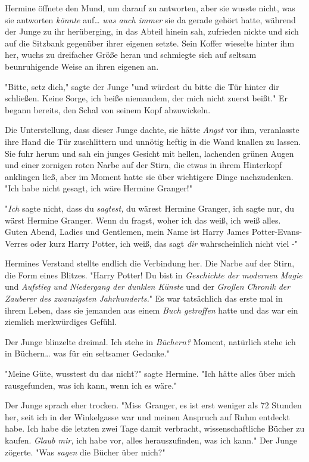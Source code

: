 {Hermine öffnete den Mund, um darauf zu antworten, aber sie wusste nicht, was sie antworten \emph{könnte} auf… \emph{was auch immer} sie da gerade gehört hatte, während der Junge zu ihr herüberging, in das Abteil hinein sah, zufrieden nickte und sich auf die Sitzbank gegenüber ihrer eigenen setzte. Sein Koffer wieselte hinter ihm her, wuchs zu dreifacher Größe heran und schmiegte sich auf seltsam beunruhigende Weise an ihren eigenen an.

"Bitte, setz dich," sagte der Junge "und würdest du bitte die Tür hinter dir schließen. Keine Sorge, ich beiße niemandem, der mich nicht zuerst beißt." Er begann bereits, den Schal von seinem Kopf abzuwickeln.

Die Unterstellung, dass dieser Junge dachte, sie hätte \emph{Angst} vor ihm, veranlasste ihre Hand die Tür zuschlittern und unnötig heftig in die Wand knallen zu lassen. Sie fuhr herum und sah ein junges Gesicht mit hellen, lachenden grünen Augen und einer zornigen roten Narbe auf der Stirn, die etwas in ihrem Hinterkopf anklingen ließ, aber im Moment hatte sie über wichtigere Dinge nachzudenken. "Ich habe nicht gesagt, ich wäre Hermine Granger!"

"\emph{Ich} sagte nicht, dass du \emph{sagtest,} du wärest Hermine Granger, ich sagte nur, du wärst Hermine Granger. Wenn du fragst, woher ich das weiß, ich weiß alles. Guten Abend, Ladies und Gentlemen, mein Name ist Harry James Potter-Evans-Verres oder kurz Harry Potter, ich weiß, das sagt \emph{dir} wahrscheinlich nicht viel -"

Hermines Verstand stellte endlich die Verbindung her. Die Narbe auf der Stirn, die Form eines Blitzes. "Harry Potter! Du bist in \emph{Geschichte der modernen Magie} und \emph{Aufstieg und Niedergang der dunklen Künste} und der \emph{Großen Chronik der Zauberer des zwanzigsten Jahrhunderts.}" Es war tatsächlich das erste mal in ihrem Leben, dass sie jemanden aus einem \emph{Buch getroffen} hatte und das war ein ziemlich merkwürdiges Gefühl.

Der Junge blinzelte dreimal. Ich stehe in \emph{Büchern?} Moment, natürlich stehe ich in Büchern… was für ein seltsamer Gedanke."

"Meine Güte, wusstest du das nicht?" sagte Hermine. "Ich hätte alles über mich rausgefunden, was ich kann, wenn ich es wäre."

Der Junge sprach eher trocken. "Miss~Granger, es ist erst weniger als 72 Stunden her, seit ich in der Winkelgasse war und meinen Anspruch auf Ruhm entdeckt habe. Ich habe die letzten zwei Tage damit verbracht, wissenschaftliche Bücher zu kaufen. \emph{Glaub mir,} ich habe vor, alles herauszufinden, was ich kann." Der Junge zögerte. "Was \emph{sagen} die Bücher über mich?"

}
